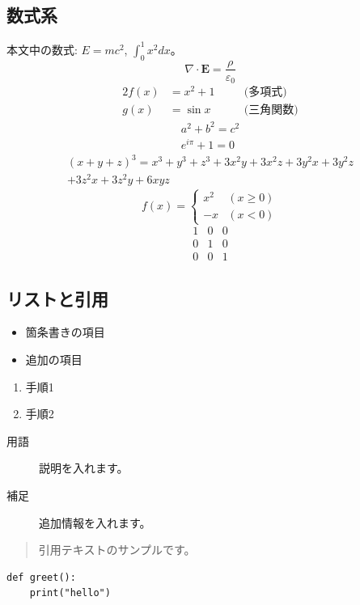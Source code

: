 \documentclass{ltjsarticle}
\theoremstyle{definition}
\begin{document}
\subsection{数式系}
本文中の数式: $E = mc^2$, $\int_0^1 x^2 dx$。
\begin{equation}
  \nabla \cdot \mathbf{E} = \frac{\rho}{\varepsilon_0}
\end{equation}
\begin{alignat}{2}
  f(x) &= x^2 + 1 &\quad& \text{(多項式)} \\
  g(x) &= \sin x   &\quad& \text{(三角関数)}
\end{alignat}
\begin{gather}
  a^2 + b^2 = c^2 \\
  e^{i\pi} + 1 = 0
\end{gather}
\begin{multline}
  (x + y + z)^3 = x^3 + y^3 + z^3 + 3x^2y + 3x^2z + 3y^2x + 3y^2z \\
  + 3z^2x + 3z^2y + 6xyz
\end{multline}
\begin{equation}
  f(x) = \begin{cases}
    x^2 & (x \ge 0) \\
    -x  & (x < 0)
  \end{cases}
\end{equation}
\[
  \begin{array}{ccc}
    1 & 0 & 0 \\
    0 & 1 & 0 \\
    0 & 0 & 1
  \end{array}
\]

\subsection{リストと引用}
\begin{itemize}
  \item 箇条書きの項目
  \item 追加の項目
\end{itemize}
\begin{enumerate}
  \item 手順1
  \item 手順2
\end{enumerate}
\begin{description}
  \item[用語] 説明を入れます。
  \item[補足] 追加情報を入れます。
\end{description}
\begin{quote}
  引用テキストのサンプルです。
\end{quote}
\begin{verbatim}
def greet():
    print("hello")
\end{verbatim}
\end{document}
